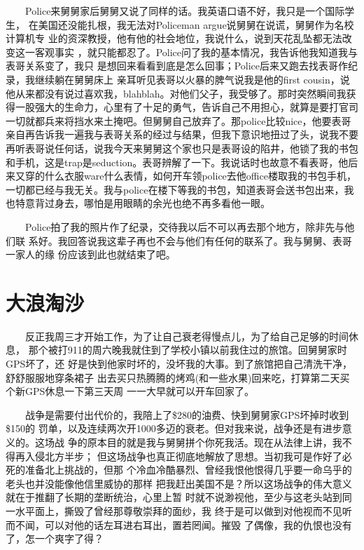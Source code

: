 \documentclass[12pt]{book}
\begin{document}
　　Police来舅舅家后舅舅又说了同样的话。我英语口语不好，我只是一个国际学生，
在美国还没能扎根，我无法对Policeman argue说舅舅在说谎，舅舅作为名校计算机专
业的资深教授，他有他的社会地位，我说什么，说到天花乱坠都无法改变这一客观事实
，就只能都忍了。Police问了我的基本情况，我告诉他我知道我与表哥关系变了，我只
是想回来看看到底是怎么回事；Police后来又跑去找表哥作纪录，我继续躺在舅舅床上
亲耳听见表哥以火暴的脾气说我是他的first cousin，说他从来都没有说过喜欢我，blahblah。对他们父子，我受够了。那时突然瞬间我获得一股强大的生命力，心里有了十足的勇气，告诉自己不用担心，就算是要打官司一切就都兵来将挡水来土掩吧。但舅舅自己放弃了。那police比较nice，他要表哥亲自再告诉我一遍我与表哥关系的经过与结果，但我下意识地扭过了头，说我不要再听表哥说任何话，说我今天来舅舅这个家也只是表哥设的陷井，他锁了我的书包和手机，这是trap是seduction。表哥辨解了一下。我说话时也故意不看表哥，他后来又穿的什么衣服ware什么表情，如何开车领police去他office楼取我的书包手机，一切都已经与我无关。我与police在楼下等我的书包，知道表哥会送书包出来，我也特意背过身去，哪怕是用眼睛的余光也绝不再多看他一眼。

　　Police拍了我的照片作了纪录，交待我以后不可以再去那个地方，除非先与他们联
系好。我回答说我这辈子再也不会与他们有任何的联系了。我与舅舅、表哥一家人的缘
份应该到此也就结束了吧。
\section{大浪淘沙}
\label{sec-8-32}

　　反正我周三才开始工作，为了让自己衰老得慢点儿，为了给自己足够的时间休息，
那个被打911的周六晚我就住到了学校小镇以前我住过的旅馆。回舅舅家时GPS坏了，还
好是快到他家时坏的，没坏我的大事。到了旅馆把自己清洗干净，舒舒服服地穿条裙子
出去买只热腾腾的烤鸡(和一些水果)回来吃，打算第二天买个新GPS休息一下第三天周
一一大早就可以开车回家了。

　　战争是需要付出代价的，我陪上了\$280的油费、快到舅舅家GPS坏掉时收到\$150的
罚单，以及连续两次开1000多迈的衰老。但对我来说，战争还是有进步意义的。这场战
争的原本目的就是我与舅舅拼个你死我活。现在从法律上讲，我不得再入侵北方半步；
但这场战争也真正彻底地解放了思想。当初我可是作好了必死的准备北上挑战的，但那
个冷血冷酷暴烈、曾经我恨他恨得几乎要一命乌乎的老头也并没能像他信里威协的那样
把我赶出美国不是？所以这场战争的伟大意义就在于推翻了长期的垄断统治，心里上暂
时就不说渺视他，至少与这老头站到同一水平面上，撕毁了曾经那尊敬崇拜的面纱，我
终于是可以做到对他视而不见听而不闻，可以对他的话左耳进右耳出，置若罔闻。摧毁
了偶像，我的仇恨也没有了，怎一个爽字了得？
\end{document}
